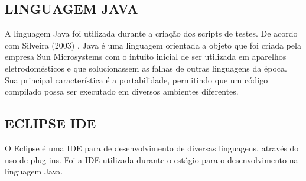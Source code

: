 \subsection{LINGUAGEM JAVA}
A linguagem Java foi utilizada durante a criação dos scripts de testes. De acordo com Silveira (2003) \nocite{Silveira2003}, Java é uma linguagem orientada a objeto que foi criada pela empresa Sun Microsystems com o intuito inicial de ser utilizada em aparelhos eletrodomésticos e que solucionassem as falhas de outras linguagens da época. Sua principal característica é a portabilidade, permitindo que um código compilado possa ser executado em diversos ambientes diferentes.

\subsection{ECLIPSE IDE}
O Eclipse é uma IDE para de desenvolvimento de diversas linguagens, através do uso de plug-ins. Foi a IDE utilizada durante o estágio para o desenvolvimento na linguagem Java.